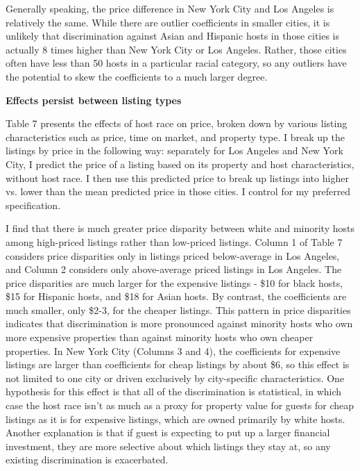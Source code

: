 \documentclass[11pt, oneside]{article}
\begin{document}
Generally speaking, the price difference in New York City and Los Angeles is relatively the same. While there are outlier coefficients in smaller cities, it is unlikely that discrimination against Asian and Hispanic hosts in those cities is actually 8 times higher than New York City or Los Angeles. Rather, those cities often have less than 50 hosts in a particular racial category, so any outliers have the potential to skew the coefficients to a much larger degree.  

\textbf{Effects persist between listing types}

Table 7 presents the effects of host race on price, broken down by various listing characteristics such as price, time on market, and property type. I break up the listings by price in the following way: separately for Los Angeles and New York City, I predict the price of a listing based on its property and host characteristics, without host race. I then use this predicted price to break up listings into higher vs. lower than the mean predicted price in those cities. I control for my preferred specification.  

I find that there is much greater price disparity between white and minority hosts among high-priced listings rather than low-priced listings. Column 1 of Table 7 considers price disparities only in listings priced below-average in Los Angeles, and Column 2 considers only above-average priced listings in Los Angeles. The price disparities are much larger for the expensive listings - \$10 for black hosts, \$15 for Hispanic hosts, and \$18 for Asian hosts. By contrast, the coefficients are much smaller, only \$2-3, for the cheaper listings. This pattern in price disparities indicates that discrimination is more pronounced against minority hosts who own more expensive properties than against minority hosts who own cheaper properties. In New York City (Columns 3 and 4), the coefficients for expensive listings are larger than coefficients for cheap listings by about \$6, so this effect is not limited to one city or driven exclusively by city-specific characteristics. One hypothesis for this effect is that all of the discrimination is statistical, in which case the host race isn't as much as a proxy for property value for guests for cheap listings  as it is for expensive listings, which are owned primarily by white hosts. Another explanation is that if guest is expecting to put up a larger financial investment, they are more selective about which listings they stay at, so any existing discrimination is exacerbated. 
\end{document}
